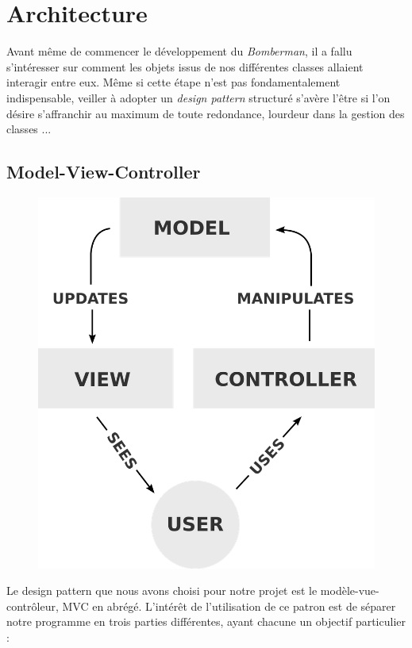 \newpage
\section{Architecture}
Avant m\^eme de commencer le développement du \textit{Bomberman}, il a fallu s'intéresser
sur comment les objets issus de nos différentes classes allaient interagir entre eux. 
Même si cette étape n'est pas fondamentalement indispensable, veiller à adopter un 
\textit{design pattern} structuré s'avère l'\^etre si l'on désire s'affranchir au maximum 
de toute redondance, lourdeur dans la gestion des classes ...

\subsection{Model-View-Controller}
\begin{figure}
\includegraphics[scale=0.1]{ch1/image1.png}

\end{figure}
Le design pattern que nous avons choisi pour notre projet est le modèle-vue-contrôleur, 
MVC en abrégé. L'intérêt de l'utilisation de ce patron est de séparer notre programme 
en trois parties différentes, ayant chacune un objectif particulier :
